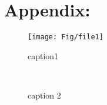 \documentclass[draft,jgr]{AGUTeX}
\begin{document}




\section{Appendix: }


\begin{figure}
	\centering
	\texttt{[image: Fig/file1]}
	\caption{ caption1}
	\label{fig:file1}
\end{figure}

\begin{figure}
	\centering
    \\
	\caption{caption 2}
	\label{fig:file2}
\end{figure}
\end{document}
